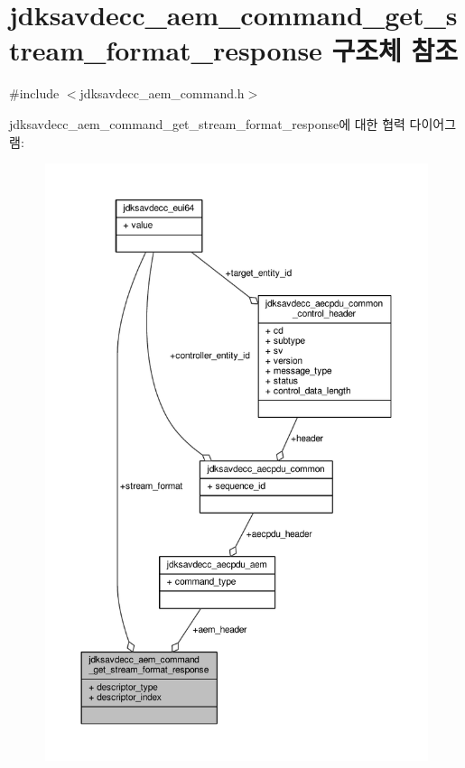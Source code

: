 \hypertarget{structjdksavdecc__aem__command__get__stream__format__response}{}\section{jdksavdecc\+\_\+aem\+\_\+command\+\_\+get\+\_\+stream\+\_\+format\+\_\+response 구조체 참조}
\label{structjdksavdecc__aem__command__get__stream__format__response}


{\ttfamily \#include $<$jdksavdecc\+\_\+aem\+\_\+command.\+h$>$}



jdksavdecc\+\_\+aem\+\_\+command\+\_\+get\+\_\+stream\+\_\+format\+\_\+response에 대한 협력 다이어그램\+:
\nopagebreak
\begin{figure}[H]
\begin{center}
\leavevmode
\includegraphics[width=350pt]{structjdksavdecc__aem__command__get__stream__format__response__coll__graph}
\end{center}
\end{figure}
